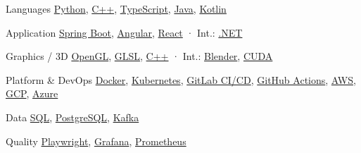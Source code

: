 
\begin{cvskills}

\cvskill
{Languages} %
{\href{https://www.python.org/}{Python}, \href{https://isocpp.org/}{C++}, \href{https://www.typescriptlang.org/}{TypeScript}, \href{https://dev.java/}{Java}, \href{https://kotlinlang.org/}{Kotlin}} %

\cvskill
{Application} %
{\href{https://spring.io/projects/spring-boot}{Spring Boot}, \href{https://angular.dev/}{Angular}, \href{https://react.dev/}{React} · Int.: \href{https://dotnet.microsoft.com/}{.NET}} %

\cvskill
{Graphics / 3D} %
{\href{https://www.opengl.org/}{OpenGL}, \href{https://www.khronos.org/opengl/wiki/OpenGL_Shading_Language}{GLSL}, \href{https://isocpp.org/}{C++} · Int.: \href{https://www.blender.org/}{Blender}, \href{https://developer.nvidia.com/cuda-toolkit}{CUDA}} %

\cvskill
{Platform \& DevOps} %
{\href{https://www.docker.com/}{Docker}, \href{https://kubernetes.io/}{Kubernetes}, \href{https://docs.gitlab.com/ee/ci/}{GitLab CI/CD}, \href{https://docs.github.com/en/actions}{GitHub Actions}, \href{https://aws.amazon.com/}{AWS}, \href{https://cloud.google.com/}{GCP}, \href{https://azure.microsoft.com/}{Azure}} %

\cvskill
{Data} %
{\href{https://www.iso.org/standard/76583.html}{SQL}, \href{https://www.postgresql.org/}{PostgreSQL}, \href{https://kafka.apache.org/}{Kafka}} %

\cvskill
{Quality} %
{\href{https://playwright.dev/}{Playwright}, \href{https://grafana.com/}{Grafana}, \href{https://prometheus.io/}{Prometheus}} %


\end{cvskills}

